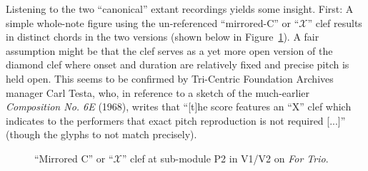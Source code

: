         Listening to the two ``canonical'' extant recordings yields some insight. First: A simple whole-note figure using the un-referenced ``mirrored-C'' or ``$\mathscr{X}$'' clef results in distinct chords in the two versions (shown below in Figure~\ref{fig:mysteryclef}). A fair assumption might be that the clef serves as a yet more open version of the diamond clef where onset and duration are relatively fixed and precise pitch is held open. This seems to be confirmed by Tri-Centric Foundation Archives manager Carl Testa, who, in reference to a sketch of the much-earlier \textit{Composition No. 6E} (1968), writes that ``[t]he score features an ``X'' clef which indicates to the performers that exact pitch reproduction is not required [...]'' (though the glyphs to not match precisely).\autocite{Testa}

            \begin{figure}
                \centering
                \qquad
                \captionsetup{width=.55\textwidth}
                \caption[``Mirrored C'' or ``$\mathscr{X}$'' clef at sub-module P2 in V1/V2 on \textit{For Trio}.]{``Mirrored C'' or ``$\mathscr{X}$'' clef at sub-module P2 in V1/V2 on \textit{For Trio}.\footnotemark}%
                \label{fig:mysteryclef}%
            \end{figure}

